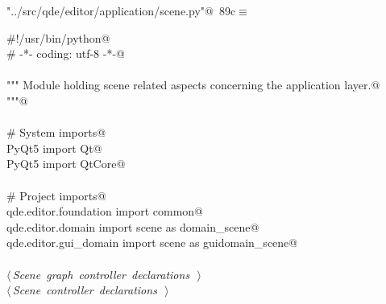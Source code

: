 \documentclass[
    a4paper,      %
    10pt,         %
    openright,    %
    notitlepage,  %
    parskip=half, %
]{scrreprt}       %
\theoremstyle{definition}                    %
\begin{document}
\begin{flushleft} \small
\begin{minipage}{\linewidth}\label{scrap143}\raggedright\small
{} \verb@"../src/qde/editor/application/scene.py"@\nobreak\ {\footnotesize {89c}}$\equiv$
\vspace{-1ex}
\begin{list}{}{} \item
\mbox{}\lstinline@#!/usr/bin/python@\\
\mbox{}\lstinline@# -*- coding: utf-8 -*-@\\
\mbox{}\lstinline@@\\
\mbox{}\lstinline@""" Module holding scene related aspects concerning the application layer.@\\
\mbox{}\lstinline@"""@\\
\mbox{}\lstinline@@\\
\mbox{}\lstinline@# System imports@\\
\mbox{}\lstinline@from PyQt5 import Qt@\\
\mbox{}\lstinline@from PyQt5 import QtCore@\\
\mbox{}\lstinline@@\\
\mbox{}\lstinline@# Project imports@\\
\mbox{}\lstinline@from qde.editor.foundation import common@\\
\mbox{}\lstinline@from qde.editor.domain     import scene as domain_scene@\\
\mbox{}\lstinline@from qde.editor.gui_domain import scene as guidomain_scene@\\
\mbox{}\lstinline@@\\
\mbox{}\lstinline@@\hbox{$\langle\,${\itshape Scene graph controller declarations}\nobreak\ {\footnotesize {}}$\,\rangle$}\lstinline@@\\
\mbox{}\lstinline@@\hbox{$\langle\,${\itshape Scene controller declarations}\nobreak\ {\footnotesize {}}$\,\rangle$}\lstinline@@\\
\mbox{}\lstinline@@{\NWsep}
\end{list}
\vspace{-1.5ex}
\footnotesize
\begin{list}{}{\setlength{\itemsep}{-\parsep}\setlength{\itemindent}{-\leftmargin}}

\item{}
\end{list}
\end{minipage}\vspace{4ex}
\end{flushleft}
\end{document}

